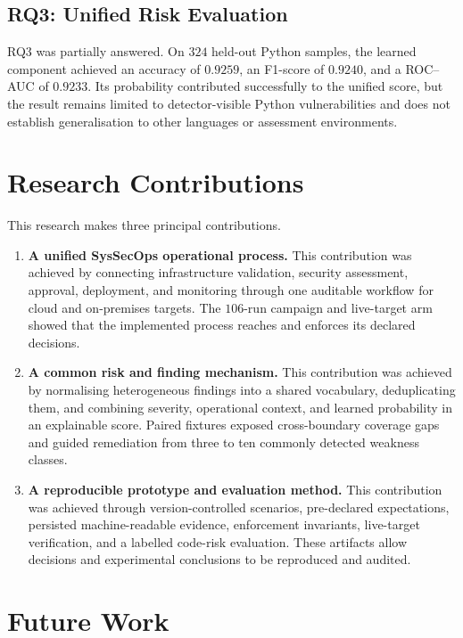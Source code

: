 \subsection{RQ3: Unified Risk Evaluation}

RQ3 was partially answered. On $324$ held-out Python samples, the learned component
achieved an accuracy of $0.9259$, an F1-score of $0.9240$, and a ROC--AUC of $0.9233$.
Its probability contributed successfully to the unified score, but the result remains
limited to detector-visible Python vulnerabilities and does not establish generalisation
to other languages or assessment environments.

\section{Research Contributions}
\label{sec:conclusion-contributions}

This research makes three principal contributions.

\begin{enumerate}
    \item \textbf{A unified SysSecOps operational process.} This contribution was
    achieved by connecting infrastructure validation, security assessment, approval,
    deployment, and monitoring through one auditable workflow for cloud and on-premises
    targets. The $106$-run campaign and live-target arm showed that the implemented
    process reaches and enforces its declared decisions.

    \item \textbf{A common risk and finding mechanism.} This contribution was achieved
    by normalising heterogeneous findings into a shared vocabulary, deduplicating them,
    and combining severity, operational context, and learned probability in an
    explainable score. Paired fixtures exposed cross-boundary coverage gaps and guided
    remediation from three to ten commonly detected weakness classes.

    \item \textbf{A reproducible prototype and evaluation method.} This contribution was
    achieved through version-controlled scenarios, pre-declared expectations, persisted
    machine-readable evidence, enforcement invariants, live-target verification, and a
    labelled code-risk evaluation. These artifacts allow decisions and experimental
    conclusions to be reproduced and audited.
\end{enumerate}

\section{Future Work}
\label{sec:conclusion-future-work}

